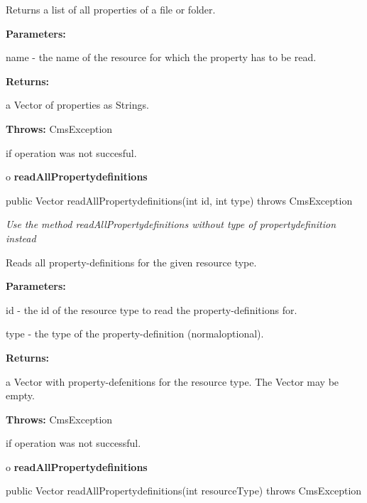 \begin{description}
\htmlDD Returns a list of all properties of a file or folder. 

\begin{description}
\item {\bf Parameters:}  

name - the name of the resource for which the property has to be read.  
\item {\bf Returns:}  

a Vector of properties as Strings.  
\item {\bf Throws:} CmsException  

if operation was not succesful.  
\end{description}

\end{description}

o {\bf readAllPropertydefinitions} 

\begin{PRE}
 public Vector readAllPropertydefinitions(int id,
                                          int type) throws CmsException
\end{PRE}

\begin{description}
 {\it Use the
method readAllPropertydefinitions without type of propertydefinition instead} 

Reads all property-definitions for the given resource type. 

\begin{description}
\item {\bf Parameters:}  

id - the id of the resource type to read the property-definitions for.  

type - the type of the property-definition (normal{\htmlBar}optional).  
\item {\bf Returns:}  

a Vector with property-defenitions for the resource type. The Vector may be
empty.  
\item {\bf Throws:} CmsException  

if operation was not successful.  
\end{description}

\end{description}

o {\bf readAllPropertydefinitions} 

\begin{PRE}
 public Vector readAllPropertydefinitions(int resourceType) throws CmsException
\end{PRE}

